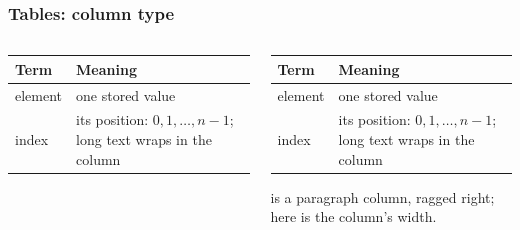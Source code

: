 \documentclass[aspectratio=169,10pt,compress]{beamer}
\begin{document}
\begin{frame}[t,fragile] \frametitle{Tables: column type }
	\begin{columns}[T]
		\begin{column}{0.52\textwidth}

\begin{texcode}
\begin{table}
  \footnotesize
  \begin{tabular}{@{}L{0.30\textwidth}L{0.55\textwidth}@{}}
    \toprule
    \textbf{Term} & \textbf{Meaning} \\
    \midrule
    element & one stored value \\
    index   & its position: $0, 1, \dots, n-1$;
              long text wraps in the column \\
    \bottomrule
  \end{tabular}
\end{table}
\end{texcode}

		\end{column}
		\begin{column}{0.44\textwidth}

\begin{table}
	\footnotesize
	\begin{tabular}{@{}L{0.30\textwidth}L{0.55\textwidth}@{}}
		\toprule
		\textbf{Term} & \textbf{Meaning} \\
		\midrule
		element & one stored value \\
		index   & its position: $0, 1, \dots, n-1$; long text wraps in the column \\
		\bottomrule
	\end{tabular}
\end{table}%

			\small {} is a paragraph column, ragged right;
			 here is the column's width.
		\end{column}
	\end{columns}
\end{frame}
\end{document}
